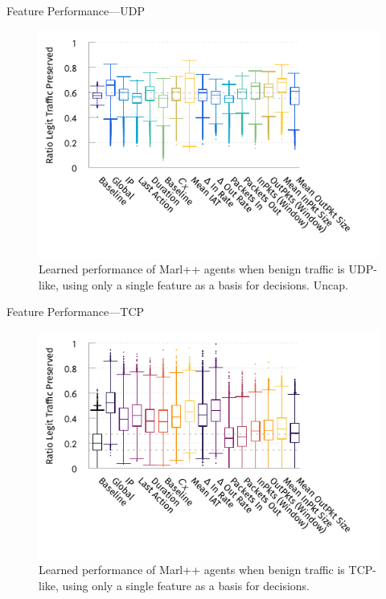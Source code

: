 \documentclass[aspectratio=169,xcolor={dvipsnames}
,hide notes
]{beamer}
\begin{document}
\begin{frame}{Feature Performance---UDP}
\begin{figure}
	\centering
	\includegraphics[width=0.8\linewidth]{../plots/ftprep-box-pres}
	\caption{
		Learned performance of Marl++ agents when benign traffic is UDP-like, using only a single feature as a basis for decisions. Uncap.
		\label{fig:udp-feature-plots}
	}
\end{figure}
\end{frame}

\begin{frame}{Feature Performance---TCP}
\begin{figure}
	\centering
	\includegraphics[width=0.8\linewidth]{../plots/ftprep-tcp-cap-box-pres}
	\caption{
		Learned performance of Marl++ agents when benign traffic is TCP-like, using only a single feature as a basis for decisions.
		\label{fig:udp-feature-plots-cap}
	}
\end{figure}
\end{frame}
\end{document}
